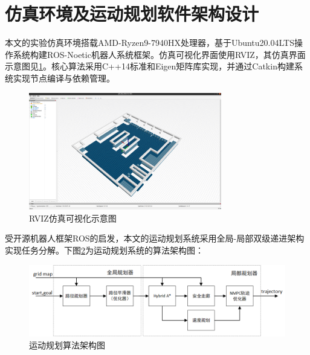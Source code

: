 \documentclass[master,academic]{ysuthesis} %
\begin{document}
	\section{仿真环境及运动规划软件架构设计}
	本文的实验仿真环境搭载AMD-Ryzen9-7940HX处理器，基于Ubuntu20.04LTS操作系统构建ROS-Noetic机器人系统框架。仿真可视化界面使用RVIZ，其仿真界面示意图见\ref{fig:rviz仿真界面}。核心算法采用C++14标准和Eigen矩阵库实现，并通过Catkin构建系统实现节点编译与依赖管理。
	\begin{figure}[H]
		\centering
		\includegraphics[width=0.75\textwidth]{rviz_view.png}
		\caption{RVIZ仿真可视化示意图}
		\label{fig:rviz仿真界面}
	\end{figure}

	受开源机器人框架ROS的启发，本文的运动规划系统采用全局-局部双级递进架构实现任务分解。下图\ref{fig:运动规划算法框架}为运动规划系统的算法架构图：
		\begin{figure}[H]
			\centering
			\includegraphics[width=1.0\textwidth]{运动规划算法框架.png}
			\caption{运动规划算法架构图}
			\label{fig:运动规划算法框架}
		\end{figure}
\end{document}
